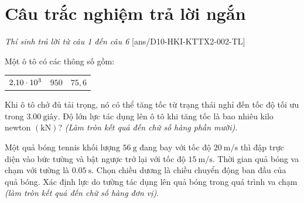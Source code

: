 \section{Câu trắc nghiệm trả lời ngắn} \textit{Thí sinh trả lời từ câu 1 đến câu 6}
\setcounter{ex}{0}
[ans/D10-HKI-KTTX2-002-TL]
\begin{ex}
	Một ô tô có các thông số gồm:
	\begin{center}
		\begin{tabular}{|M{5cm}|M{5cm}|M{5cm}|}
			\hline
		 &&\\
		\hline
		$\SI{2.10E3}{}$ & $950$ & $75,6$\\
		\hline
		\end{tabular}
	\end{center}
	Khi ô tô chở đủ tải trọng, nó có thể tăng tốc từ trạng thái nghỉ đến tốc độ tối ưu trong $\SI{3.00}{\text{giây}}$. Độ lớn lực tác dụng lên ô tô khi tăng tốc là bao nhiêu kilo newton $\left(\si{\kilo\newton}\right)$? \textit{(Làm tròn kết quả đến chữ số hàng phần mười)}.
	\loigiai{
		
	}
\end{ex}
\begin{ex}
	Một quả bóng tennis khối lượng $\SI{56}{\gram}$ đang bay với tốc độ $\SI{20}{\meter/\second}$ thì đập trực diện vào bức tường và bật ngược trở lại với tốc độ $\SI{15}{\meter/\second}$. Thời gian quả bóng va chạm với tường là $\SI{0.05}{\second}$. Chọn chiều dương là chiều chuyển động ban đầu của quả bóng. Xác định lực do tường tác dụng lên quả bóng trong quá trình va chạm \textit{(làm tròn kết quả đến chữ số hàng đơn vị)}. 
	\loigiai{
		
	}
\end{ex}
